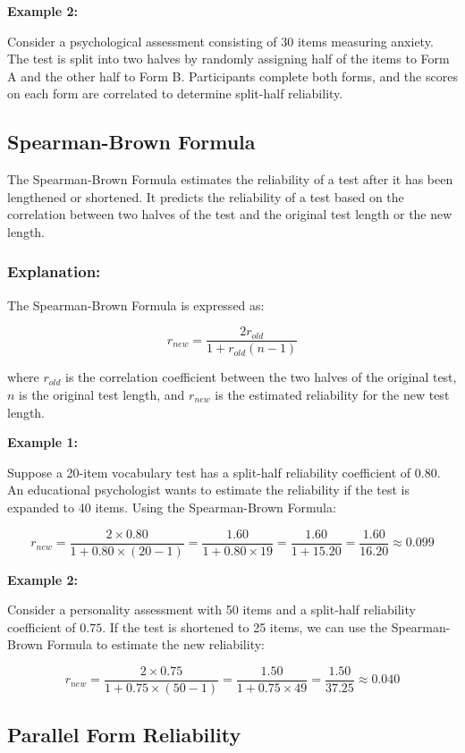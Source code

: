 \documentclass[12pt, a4paper]{exam}
\begin{document}
\textbf{Example 2:}

Consider a psychological assessment consisting of 30 items measuring anxiety. The test is split into two halves by randomly assigning half of the items to Form A and the other half to Form B. Participants complete both forms, and the scores on each form are correlated to determine split-half reliability.

\subsection{Spearman-Brown Formula}

The Spearman-Brown Formula estimates the reliability of a test after it has been lengthened or shortened. It predicts the reliability of a test based on the correlation between two halves of the test and the original test length or the new length.

\subsubsection{Explanation:}

The Spearman-Brown Formula is expressed as:

\[
r_{new} = \frac{2r_{old}}{1 + r_{old}(n - 1)}
\]

where \(r_{old}\) is the correlation coefficient between the two halves of the original test, \(n\) is the original test length, and \(r_{new}\) is the estimated reliability for the new test length.

\textbf{Example 1:}

Suppose a 20-item vocabulary test has a split-half reliability coefficient of \(0.80\). An educational psychologist wants to estimate the reliability if the test is expanded to 40 items. Using the Spearman-Brown Formula:

\[
r_{new} = \frac{2 \times 0.80}{1 + 0.80 \times (20 - 1)} = \frac{1.60}{1 + 0.80 \times 19} = \frac{1.60}{1 + 15.20} = \frac{1.60}{16.20} \approx 0.099
\]

\textbf{Example 2:}

Consider a personality assessment with 50 items and a split-half reliability coefficient of \(0.75\). If the test is shortened to 25 items, we can use the Spearman-Brown Formula to estimate the new reliability:

\[
r_{new} = \frac{2 \times 0.75}{1 + 0.75 \times (50 - 1)} = \frac{1.50}{1 + 0.75 \times 49} = \frac{1.50}{37.25} \approx 0.040
\]

\subsection{Parallel Form Reliability}
\end{document}
